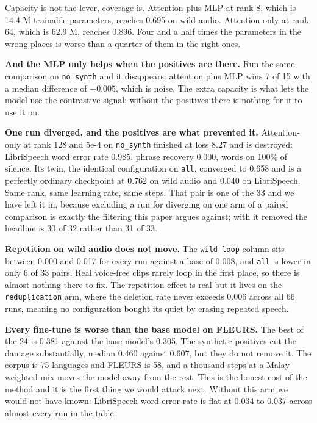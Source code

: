 \documentclass[preprint]{article}
\begin{document}
Capacity is not the lever, coverage is. Attention plus MLP at rank 8, which is 14.4 M trainable
parameters, reaches 0.695 on wild audio. Attention only at rank 64, which is 62.9 M, reaches
0.896. Four and a half times the parameters in the wrong places is worse than a
quarter of them in the right ones.

\textbf{And the MLP only helps when the positives are there.} Run the same comparison on
\texttt{no\_synth} and it disappears: attention plus MLP wins 7 of 15 with a median difference
of $+0.005$, which is noise. The extra capacity is what lets the model use the contrastive
signal; without the positives there is nothing for it to use it on.

\textbf{One run diverged, and the positives are what prevented it.} Attention-only at rank 128
and 5e-4 on \texttt{no\_synth} finished at loss 8.27 and is destroyed: LibriSpeech word error
rate 0.985, phrase recovery 0.000, words on 100\% of silence. Its twin, the identical
configuration on \texttt{all}, converged to 0.658 and is a perfectly ordinary checkpoint at
0.762 on wild audio and 0.040 on LibriSpeech. Same rank, same learning rate, same steps. That
pair is one of the 33 and we have left it in, because excluding a run for diverging on one arm
of a paired comparison is exactly the filtering this paper argues against; with it removed the
headline is 30 of 32 rather than 31 of 33.

\textbf{Repetition on wild audio does not move.} The \texttt{wild loop} column sits between
0.000 and 0.017 for every run against a base of 0.008, and \texttt{all} is lower in only 6 of
33 pairs. Real voice-free clips rarely loop in the first place, so there is almost nothing
there to fix. The
repetition effect is real but it lives on the \texttt{reduplication} arm, where the deletion
rate never exceeds 0.006 across all 66 runs, meaning no configuration bought its quiet by
erasing repeated speech.

\textbf{Every fine-tune is worse than the base model on FLEURS.} The best of the 24 is 0.381
against the base model's 0.305. The synthetic positives cut the damage substantially, median
0.460 against 0.607, but they do not remove it. The corpus is 75 languages and FLEURS is 58, and
a thousand steps at a Malay-weighted mix moves the model away from the rest. This is the
honest cost of the method and it is the first thing we would attack next. Without this arm we
would not have known: LibriSpeech word error rate is flat at 0.034 to 0.037 across almost every
run in the table.
\end{document}
